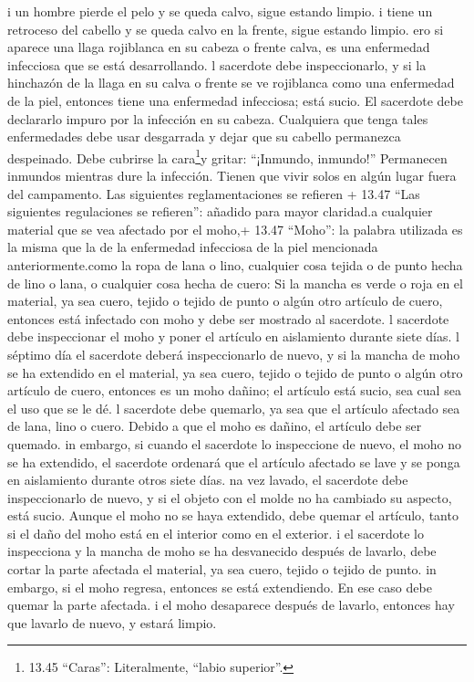  i un hombre pierde el pelo y se queda calvo, sigue estando
limpio.  i tiene un retroceso del cabello y se queda calvo
en la frente, sigue estando limpio.  ero si aparece una
llaga rojiblanca en su cabeza o frente calva, es una enfermedad
infecciosa que se está desarrollando.  l sacerdote debe
inspeccionarlo, y si la hinchazón de la llaga en su calva o frente se ve
rojiblanca como una enfermedad de la piel,  entonces tiene
una enfermedad infecciosa; está sucio. El sacerdote debe declararlo
impuro por la infección en su cabeza.  Cualquiera que tenga
tales enfermedades debe usar desgarrada y dejar que su cabello
permanezca despeinado. Debe cubrirse la cara\footnote{13.45 ``Caras'':
  Literalmente, ``labio superior''.}y gritar: ``¡Inmundo, inmundo!''
 Permanecen inmundos mientras dure la infección. Tienen que
vivir solos en algún lugar fuera del campamento.  Las
siguientes reglamentaciones se refieren + 13.47 ``Las siguientes
regulaciones se refieren'': añadido para mayor claridad.a cualquier
material que se vea afectado por el moho,+ 13.47 ``Moho'': la palabra
utilizada es la misma que la de la enfermedad infecciosa de la piel
mencionada anteriormente.como la ropa de lana o lino, 
cualquier cosa tejida o de punto hecha de lino o lana, o cualquier cosa
hecha de cuero:  Si la mancha es verde o roja en el
material, ya sea cuero, tejido o tejido de punto o algún otro artículo
de cuero, entonces está infectado con moho y debe ser mostrado al
sacerdote.  l sacerdote debe inspeccionar el moho y poner
el artículo en aislamiento durante siete días.  l séptimo
día el sacerdote deberá inspeccionarlo de nuevo, y si la mancha de moho
se ha extendido en el material, ya sea cuero, tejido o tejido de punto o
algún otro artículo de cuero, entonces es un moho dañino; el artículo
está sucio, sea cual sea el uso que se le dé.  l sacerdote
debe quemarlo, ya sea que el artículo afectado sea de lana, lino o
cuero. Debido a que el moho es dañino, el artículo debe ser quemado.
 in embargo, si cuando el sacerdote lo inspeccione de
nuevo, el moho no se ha extendido,  el sacerdote ordenará
que el artículo afectado se lave y se ponga en aislamiento durante otros
siete días.  na vez lavado, el sacerdote debe
inspeccionarlo de nuevo, y si el objeto con el molde no ha cambiado su
aspecto, está sucio. Aunque el moho no se haya extendido, debe quemar el
artículo, tanto si el daño del moho está en el interior como en el
exterior.  i el sacerdote lo inspecciona y la mancha de
moho se ha desvanecido después de lavarlo, debe cortar la parte afectada
el material, ya sea cuero, tejido o tejido de punto.  in
embargo, si el moho regresa, entonces se está extendiendo. En ese caso
debe quemar la parte afectada.  i el moho desaparece
después de lavarlo, entonces hay que lavarlo de nuevo, y estará limpio.

